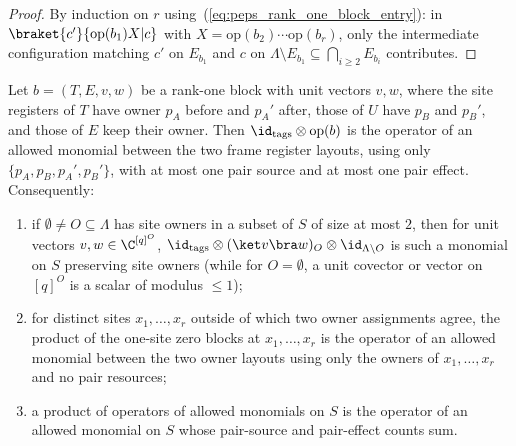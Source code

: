\begin{proof}\leanok
    By induction on $r$ using~(\ref{eq:peps_rank_one_block_entry}): in $\braket{c'}{\mathrm{op}(b_1)X|c}$ with $X=\mathrm{op}(b_2)\cdots\mathrm{op}(b_r)$, only the intermediate configuration matching $c'$ on $E_{b_1}$ and $c$ on $\Lambda\setminus E_{b_1}\subseteq\bigcap_{i\ge2}E_{b_i}$ contributes.
\end{proof}

\begin{lemma}
    \label{lem:peps_rank_one_block_monomial}
    \leanok
    Let $b=(T,E,v,w)$ be a rank-one block with unit vectors $v,w$, where the site registers
    of $T$ have owner $p_A$ before and $p_A'$ after, those of $U$ have $p_B$
    and $p_B'$, and those of $E$ keep their owner. Then
    $\id_{\rm tags}\otimes\mathrm{op}(b)$ is the operator of an allowed
    monomial between the two frame register layouts, using only $\{p_A,p_B,p_A',p_B'\}$, with at most one pair source
    and at most one pair effect. Consequently:
    \begin{enumerate}
        \item if $\emptyset\ne O\subseteq\Lambda$ has site owners in a subset of $S$ of size at most $2$, then for unit vectors $v,w\in\C^{[q]^O}$,
              $\id_{\rm tags}\otimes(\ket v\bra w)_O\otimes\id_{\Lambda\setminus O}$
              is such a monomial on $S$ preserving site owners (while for $O=\emptyset$, a unit covector or vector on $[q]^O$ is a scalar of modulus $\le1$);
        \item for distinct sites $x_1,\dots,x_r$ outside of which two owner
              assignments agree, the product of the one-site zero blocks at $x_1,\dots,x_r$ is the operator of an allowed monomial between the two owner layouts using only the owners of $x_1,\dots,x_r$ and no pair resources;
        \item a product of operators of allowed monomials on $S$ is the operator of an
              allowed monomial on $S$ whose pair-source and pair-effect counts sum.
    \end{enumerate}
\end{lemma}

